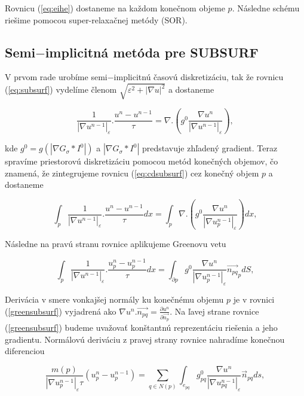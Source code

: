 \documentclass[a4paper,11pt,twoside]{article}%
\def\epsilon{\varepsilon}
\begin{document}
Rovnicu (\ref{eq:eihe}) dostaneme na každom konečnom objeme $p$. Následne schému riešime pomocou super-relaxačnej metódy (SOR). 

\subsection{Semi$-$implicitná metóda pre SUBSURF}

V prvom rade urobíme semi$-$implicitnú časovú diskretizáciu, tak že rovnicu (\ref{eq:subsurf}) vydelíme členom $\sqrt{\epsilon^2 + |\nabla u|^2}$ a dostaneme

\begin{equation} \label{eq:cdsubsurf}
\frac{1}{|\nabla u^{n-1}|_{\epsilon}}.\frac{u^n-u^{n-1}}{\tau} = \nabla.(g^0\frac{\nabla u^n}{|\nabla u^{n-1}|_{\epsilon}}),
\end{equation}

kde $g^0 = g(|\nabla G_{\sigma}*I^0|)$ a $|\nabla G_{\sigma}*I^0|$ predstavuje zhľadený gradient. Teraz spravíme priestorovú diskretizáciu pomocou metód konečných objemov, čo znamená, že zintegrujeme rovnicu (\ref{eq:cdsubsurf}) cez konečný objem $p$ a dostaneme

\begin{equation}
\int_{p}\frac{1}{|\nabla u^{n-1}|_{\epsilon}}.\frac{u^n-u^{n-1}}{\tau}dx = \int_{p}\nabla.(g^0\frac{\nabla u^n}{|\nabla u_p^{n-1}|_{\epsilon}})dx,
\end{equation}

Následne na pravú stranu rovnice aplikujeme Greenovu vetu

\begin{equation} \label{greensubsurf}
\int_{p}\frac{1}{|\nabla u^{n-1}|_{\epsilon}}.\frac{u_p^n-u_p^{n-1}}{\tau}dx = \int_{\partial p} g^0\frac{\nabla u^n}{|\nabla u_p^{n-1}|_{\epsilon}}\vec{n_{pq}}_pdS,
\end{equation}

Derivácia v smere vonkajšej normály ku konečnému objemu $p$ je v rovnici (\ref{greensubsurf}) vyjadrená ako $\nabla u^n.\vec{n_{pq}} = \frac{\partial u^n }{\partial \vec{n_{p}}}$. Na ľavej strane rovnice (\ref{greensubsurf}) budeme uvažovať konštantnú reprezentáciu riešenia a jeho gradientu. Normálovú deriváciu z pravej strany rovnice nahradíme konečnou diferenciou




\begin{equation}
\frac{m(p)}{|\nabla u_p^{n-1}|_{\epsilon}\tau}(u_p^n-u_p^{n-1}) = \sum_{q \in N(p)}\int_{e_{pq}}g_{pq}^0\frac{\nabla u^n}{|\nabla u_{pq}^{n-1}|_{\epsilon}}\vec{n}_{pq}ds,
\end{equation}
\end{document}
